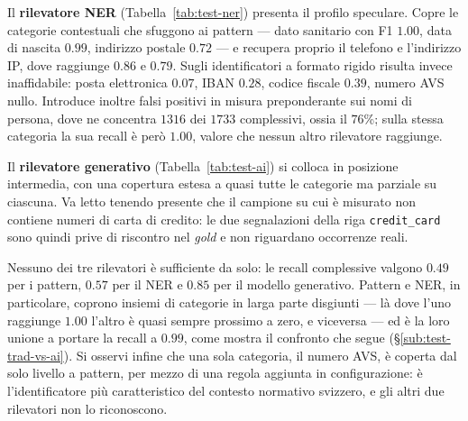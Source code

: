 Il \textbf{rilevatore NER} (Tabella~\ref{tab:test-ner}) presenta il profilo speculare. Copre le categorie contestuali che sfuggono ai pattern --- dato sanitario con F1 $1.00$, data di nascita $0.99$, indirizzo postale $0.72$ --- e recupera proprio il telefono e l'indirizzo IP, dove raggiunge $0.86$ e $0.79$. Sugli identificatori a formato rigido risulta invece inaffidabile: posta elettronica $0.07$, IBAN $0.28$, codice fiscale $0.39$, numero AVS nullo. Introduce inoltre falsi positivi in misura preponderante sui nomi di persona, dove ne concentra $1316$ dei $1733$ complessivi, ossia il $76$\%; sulla stessa categoria la sua recall è però $1.00$, valore che nessun altro rilevatore raggiunge.

Il \textbf{rilevatore generativo} (Tabella~\ref{tab:test-ai}) si colloca in posizione intermedia, con una copertura estesa a quasi tutte le categorie ma parziale su ciascuna. Va letto tenendo presente che il campione su cui è misurato non contiene numeri di carta di credito: le due segnalazioni della riga \texttt{credit\_card} sono quindi prive di riscontro nel \textit{gold} e non riguardano occorrenze reali.

Nessuno dei tre rilevatori è sufficiente da solo: le recall complessive valgono $0.49$ per i pattern, $0.57$ per il NER e $0.85$ per il modello generativo. Pattern e NER, in particolare, coprono insiemi di categorie in larga parte disgiunti --- là dove l'uno raggiunge $1.00$ l'altro è quasi sempre prossimo a zero, e viceversa --- ed è la loro unione a portare la recall a $0.99$, come mostra il confronto che segue (§\ref{sub:test-trad-vs-ai}). Si osservi infine che una sola categoria, il numero AVS, è coperta dal solo livello a pattern, per mezzo di una regola aggiunta in configurazione: è l'identificatore più caratteristico del contesto normativo svizzero, e gli altri due rilevatori non lo riconoscono.

